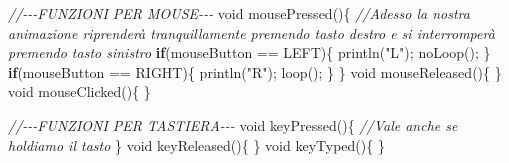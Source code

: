 \documentclass[
]{article}
\newenvironment{Shaded}{}{}
\newcommand{\CommentTok}[1]{\textcolor[rgb]{0.38,0.63,0.69}{\textit{#1}}}
\newcommand{\ControlFlowTok}[1]{\textcolor[rgb]{0.00,0.44,0.13}{\textbf{#1}}}
\newcommand{\DataTypeTok}[1]{\textcolor[rgb]{0.56,0.13,0.00}{#1}}
\newcommand{\FunctionTok}[1]{\textcolor[rgb]{0.02,0.16,0.49}{#1}}
\newcommand{\NormalTok}[1]{#1}
\newcommand{\OperatorTok}[1]{\textcolor[rgb]{0.40,0.40,0.40}{#1}}
\newcommand{\StringTok}[1]{\textcolor[rgb]{0.25,0.44,0.63}{#1}}
\begin{document}
\begin{Shaded}
\begin{Highlighting}[]
  \CommentTok{//{-}{-}{-}FUNZIONI PER MOUSE{-}{-}{-}}
  \DataTypeTok{void} \FunctionTok{mousePressed}\OperatorTok{()\{} \CommentTok{//Adesso la nostra animazione riprenderà tranquillamente premendo tasto destro e si interromperà premendo tasto sinistro}
     \ControlFlowTok{if}\OperatorTok{(}\NormalTok{mouseButton }\OperatorTok{==}\NormalTok{ LEFT}\OperatorTok{)\{}
        \FunctionTok{println}\OperatorTok{(}\StringTok{"L"}\OperatorTok{);}
        \FunctionTok{noLoop}\OperatorTok{();}
    \OperatorTok{\}}
    \ControlFlowTok{if}\OperatorTok{(}\NormalTok{mouseButton }\OperatorTok{==}\NormalTok{ RIGHT}\OperatorTok{)\{}
        \FunctionTok{println}\OperatorTok{(}\StringTok{"R"}\OperatorTok{);}
        \FunctionTok{loop}\OperatorTok{();}
    \OperatorTok{\}}
  \OperatorTok{\}}
  \DataTypeTok{void} \FunctionTok{mouseReleased}\OperatorTok{()\{}
  \OperatorTok{\}}
  \DataTypeTok{void} \FunctionTok{mouseClicked}\OperatorTok{()\{}
  \OperatorTok{\}}

  \CommentTok{//{-}{-}{-}FUNZIONI PER TASTIERA{-}{-}{-}}
  \DataTypeTok{void} \FunctionTok{keyPressed}\OperatorTok{()\{} \CommentTok{//Vale anche se holdiamo il tasto}
  \OperatorTok{\}}
  \DataTypeTok{void} \FunctionTok{keyReleased}\OperatorTok{()\{}
  \OperatorTok{\}}
  \DataTypeTok{void} \FunctionTok{keyTyped}\OperatorTok{()\{}
  \OperatorTok{\}}
\end{Highlighting}
\end{Shaded}
\end{document}
